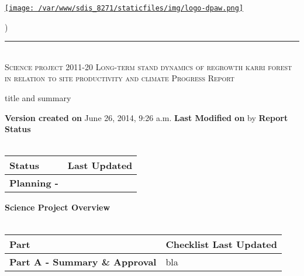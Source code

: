 \documentclass[version=last, paper=a4, DIV=18, usenames, dvipsnames]{scrartcl}
\newcommand{\HRule}{\rule{\linewidth}{0.1pt}}
\begin{document}
\setcounter{secnumdepth}{-1}


\begin{titlepage}
\begin{center}
\begin{minipage}[t]{0.28\textwidth}
\begin{flushleft}
\href{http://www.dpaw.wa.gov.au}{\texttt{[image: /var/www/sdis\_8271/staticfiles/img/logo-dpaw.png]}}
\end{flushleft}
\end{minipage}
\begin{minipage}[b]{0.7\textwidth}
\begin{flushright}
    \href{http://sdis.dpaw.wa.gov.au/documents/progressreport/1164/download/}{}) \\
\end{flushright}
\end{minipage}
\HRule \\[0.4cm]
\vfill
\textsc{\Huge Science project 2011-20 Long-term stand dynamics of regrowth karri forest in relation to site productivity and climate \newline }
\vfill
\textsc{\Huge Progress Report}

\vfill\vfill\vfill\vfill
title and summary

\vfill\vfill\vfill\vfill\vfill\vfill\vfill\vfill

\textbf{Version created on} June 26, 2014, 9:26 a.m.
\vfill
\textbf{Last Modified on}  by 
\vfill\vfill
\textbf{Report Status}\\\,
\begin{tabu} to \linewidth { | X[l] | X | }
\hline
{}
Status & Last Updated \\
\hline
\textbf{Planning - } \\
\hline
\end{tabu}
\vfill
\textbf{Science Project Overview}\\\,
\begin{tabu} to \linewidth { | X[l] | X | }
\hline
{}
Part & Checklist Last Updated \\
\hline
\textbf{Part A - Summary \& Approval} & bla \\
\hline
\end{tabu}

\end{center}
\end{titlepage}

\setcounter{tocdepth}{2}
\tableofcontents
\clearpage
\end{document}
